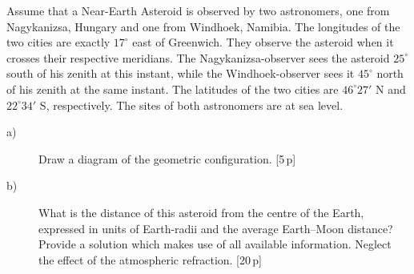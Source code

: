 Assume that a Near-Earth Asteroid is observed by two astronomers, one from
Nagykanizsa, Hungary and one from Windhoek, Namibia. The longitudes of the two
cities are exactly $17^\circ$ east of Greenwich. They observe the asteroid when
it crosses their respective meridians. The Nagykanizsa-observer sees the
asteroid $25^\circ$ south of his zenith at this instant, while the
Windhoek-observer sees it $45^\circ$ north of his zenith at the same instant.
The latitudes of the two cities are $46^\circ 27'$ N and $22^\circ 34'$ S,
respectively. The sites of both astronomers are at sea level.

\begin{description}
\item[a)] Draw a diagram of the geometric configuration. \hfill[5\,p]
\item[b)] What is the distance of this asteroid from the centre of the Earth,
  expressed in units of Earth-radii and the average Earth--Moon distance?
  Provide a solution which makes use of all available information. Neglect the
  effect of the atmospheric refraction. \hfill[20\,p]
\end{description}
